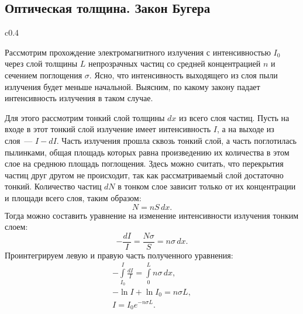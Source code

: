 \subsection{Оптическая толщина. Закон Бугера}
\begin{wrapfigure}[10]{c}{0.4\tw}
	\centering
\caption{}
\label{}
\end{wrapfigure}
Рассмотрим прохождение электромагнитного излучения с интенсивностью $I_0$ через слой толщины $L$ непрозрачных частиц со средней концентрацией $n$ и сечением поглощения $\sigma$. Ясно, что интенсивность выходящего из слоя пыли излучения будет меньше начальной. Выясним, по какому закону падает интенсивность излучения в таком случае.

Для этого рассмотрим тонкий слой толщины $dx$ из всего слоя частиц. Пусть на входе в этот тонкий слой излучение имеет интенсивность $I$, а на выходе из слоя~--- $I - dI$. Часть излучения прошла сквозь тонкий слой, а часть поглотилась пылинками, общая площадь которых равна произведению их количества в этом слое на среднюю площадь поглощения. Здесь можно считать, что перекрытия частиц друг другом не происходит, так как рассматриваемый слой достаточно тонкий. Количество частиц  $dN$ в тонком слое зависит только от их концентрации и площади всего слоя, таким образом:
\begin{equation*}
	N = n S \, dx.
\end{equation*}
Тогда можно составить уравнение на изменение интенсивности излучения тонким слоем:
\begin{equation*}
	-\frac{dI}{I} = \frac{N\sigma}{S} = n\sigma \, dx.
\end{equation*}
Проинтегрируем левую и правую часть полученного уравнения:
\begin{gather*}
	-\int\limits_{I_0}^{I} \frac{dI}{I} = \int\limits_{0}^{L} n \sigma \, dx,\\
	-\ln I + \ln I_0 = n\sigma L,\\[.5pc]
	I = I_0 e^{-n\sigma L}. \tag{\theequation}
\end{gather*}

